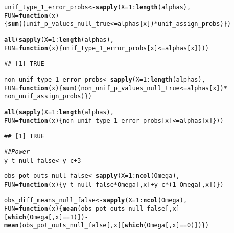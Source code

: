 \documentclass[11pt,leqno]{article}\usepackage[]{graphicx}\usepackage[]{color}
\makeatletter
\newcommand{\hlnum}[1]{\textcolor[rgb]{0.686,0.059,0.569}{#1}}%
\newcommand{\hlcom}[1]{\textcolor[rgb]{0.678,0.584,0.686}{\textit{#1}}}%
\newcommand{\hlopt}[1]{\textcolor[rgb]{0,0,0}{#1}}%
\newcommand{\hlstd}[1]{\textcolor[rgb]{0.345,0.345,0.345}{#1}}%
\newcommand{\hlkwa}[1]{\textcolor[rgb]{0.161,0.373,0.58}{\textbf{#1}}}%
\newcommand{\hlkwb}[1]{\textcolor[rgb]{0.69,0.353,0.396}{#1}}%
\newcommand{\hlkwc}[1]{\textcolor[rgb]{0.333,0.667,0.333}{#1}}%
\newcommand{\hlkwd}[1]{\textcolor[rgb]{0.737,0.353,0.396}{\textbf{#1}}}%
\newenvironment{kframe}{%
 \def\at@end@of@kframe{}%
 \ifinner\ifhmode%
  \def\at@end@of@kframe{\end{minipage}}%
  \begin{minipage}{\columnwidth}%
 \fi\fi%
 \def\FrameCommand##1{\hskip\@totalleftmargin \hskip-\fboxsep
 \colorbox{shadecolor}{##1}\hskip-\fboxsep
     \hskip-\linewidth \hskip-\@totalleftmargin \hskip\columnwidth}%
 \MakeFramed {\advance\hsize-\width
   \@totalleftmargin\z@ \linewidth\hsize
   \@setminipage}}%
 {\par\unskip\endMakeFramed%
 \at@end@of@kframe}
\newenvironment{knitrout}{}{} %
\theoremstyle{newstyle}
\makeatother
\begin{document}
\begin{knitrout}
\begin{kframe}
\begin{alltt}
\hlstd{unif_type_1_error_probs} \hlkwb{<-} \hlkwd{sapply}\hlstd{(}\hlkwc{X} \hlstd{=} \hlnum{1}\hlopt{:}\hlkwd{length}\hlstd{(alphas),}
                                  \hlkwc{FUN} \hlstd{=} \hlkwa{function}\hlstd{(}\hlkwc{x}\hlstd{) \{} \hlkwd{sum}\hlstd{((unif_p_values_null_true} \hlopt{<=} \hlstd{alphas[x])} \hlopt{*} \hlstd{unif_assign_probs) \})}

\hlkwd{all}\hlstd{(}\hlkwd{sapply}\hlstd{(}\hlkwc{X} \hlstd{=} \hlnum{1}\hlopt{:}\hlkwd{length}\hlstd{(alphas),}
           \hlkwc{FUN} \hlstd{=} \hlkwa{function}\hlstd{(}\hlkwc{x}\hlstd{) \{ unif_type_1_error_probs[x]} \hlopt{<=} \hlstd{alphas[x] \}))}
\end{alltt}
\begin{verbatim}
## [1] TRUE
\end{verbatim}
\begin{alltt}
\hlstd{non_unif_type_1_error_probs} \hlkwb{<-} \hlkwd{sapply}\hlstd{(}\hlkwc{X} \hlstd{=} \hlnum{1}\hlopt{:}\hlkwd{length}\hlstd{(alphas),}
                                      \hlkwc{FUN} \hlstd{=} \hlkwa{function}\hlstd{(}\hlkwc{x}\hlstd{) \{} \hlkwd{sum}\hlstd{((non_unif_p_values_null_true} \hlopt{<=} \hlstd{alphas[x])} \hlopt{*}
                                                                \hlstd{non_unif_assign_probs) \})}

\hlkwd{all}\hlstd{(}\hlkwd{sapply}\hlstd{(}\hlkwc{X} \hlstd{=} \hlnum{1}\hlopt{:}\hlkwd{length}\hlstd{(alphas),}
           \hlkwc{FUN} \hlstd{=} \hlkwa{function}\hlstd{(}\hlkwc{x}\hlstd{) \{ non_unif_type_1_error_probs[x]} \hlopt{<=} \hlstd{alphas[x] \}))}
\end{alltt}
\begin{verbatim}
## [1] TRUE
\end{verbatim}
\begin{alltt}
\hlcom{## Power}
\hlstd{y_t_null_false} \hlkwb{<-} \hlstd{y_c} \hlopt{+} \hlnum{3}

\hlstd{obs_pot_outs_null_false} \hlkwb{<-} \hlkwd{sapply}\hlstd{(}\hlkwc{X} \hlstd{=} \hlnum{1}\hlopt{:}\hlkwd{ncol}\hlstd{(Omega),}
                                  \hlkwc{FUN} \hlstd{=} \hlkwa{function}\hlstd{(}\hlkwc{x}\hlstd{) \{ y_t_null_false} \hlopt{*} \hlstd{Omega[,x]} \hlopt{+} \hlstd{y_c} \hlopt{*} \hlstd{(}\hlnum{1} \hlopt{-} \hlstd{Omega[,x]) \})}

\hlstd{obs_diff_means_null_false} \hlkwb{<-} \hlkwd{sapply}\hlstd{(}\hlkwc{X} \hlstd{=} \hlnum{1}\hlopt{:}\hlkwd{ncol}\hlstd{(Omega),}
                                    \hlkwc{FUN} \hlstd{=} \hlkwa{function}\hlstd{(}\hlkwc{x}\hlstd{) \{} \hlkwd{mean}\hlstd{(obs_pot_outs_null_false[,x][}\hlkwd{which}\hlstd{(Omega[,x]} \hlopt{==} \hlnum{1}\hlstd{)])} \hlopt{-}
                                        \hlkwd{mean}\hlstd{(obs_pot_outs_null_false[,x][}\hlkwd{which}\hlstd{(Omega[,x]} \hlopt{==} \hlnum{0}\hlstd{)]) \})}


\end{alltt}
\end{kframe}
\end{knitrout}
\end{document}
